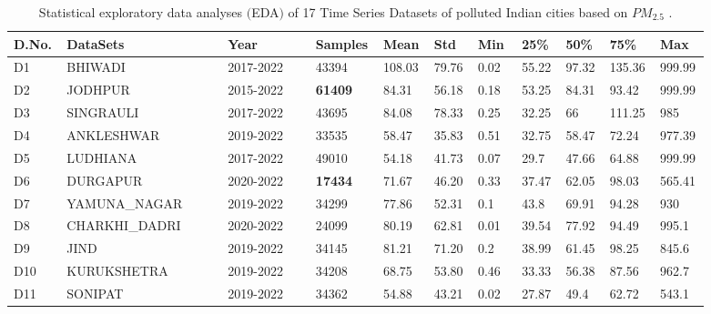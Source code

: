 \begin{landscape}
    \setlength{\tabcolsep}{3pt}
  
    {\renewcommand{\arraystretch}{1}%
    \begin{longtable}[h!]{ p{0.06\linewidth} p{0.22\linewidth} p{0.12\linewidth} p{0.07\linewidth} p{0.06\linewidth}  p{0.06\linewidth} p{0.06\linewidth} p{0.06\linewidth} p{0.06\linewidth} p{0.06\linewidth} p{0.06\linewidth}}%
    \caption{Statistical exploratory data analyses $($EDA$)$ of 17 Time Series Datasets of polluted Indian cities based on $PM_{2.5}$ \cite{bhawan2020central}.}
    \label{Eda1}\\
    \hline D.No. & DataSets & Year  & Samples &Mean &Std & Min &25\% &50\% &75\% & Max\\ \hline
    \endhead
    \hline
    \endfoot
    \endlastfoot
    D1 &  BHIWADI          & 2017-2022  & 43394   & 108.03 & 79.76  & 0.02 & 55.22   & 97.32       & 135.36 & 999.99 \\ 
    D2 &  JODHPUR     & 2015-2022 &\textbf{61409} & 84.31 & 56.18 & 0.18 & 53.25   & 84.31 & 93.42   & 999.99 \\
    D3 &  SINGRAULI    & 2017-2022 & 43695   & 84.08 & 78.33 & 0.25 & 32.25   & 66          & 111.25  & 985    \\
    D4 &  ANKLESHWAR   & 2019-2022  & 33535     & 58.47 & 35.83 & 0.51 & 32.75   & 58.47 & 72.24   & 977.39 \\ 
    D5 &  LUDHIANA        & 2017-2022  & 49010  & 54.18 & 41.73 & 0.07 & 29.7    & 47.66       & 64.88   & 999.99 \\
    D6 &  DURGAPUR       & 2020-2022 & \textbf{17434}   & 71.67 & 46.20 & 0.33 & 37.47 & 62.05      & 98.03 & 565.41 \\ 
    D7 &  YAMUNA\_NAGAR  & 2019-2022 & 34299   & 77.86  & 52.31 & 0.1  & 43.8    & 69.91       & 94.28   & 930    \\
    D8 &  CHARKHI\_DADRI  & 2020-2022  & 24099   & 80.19 & 62.81 & 0.01 & 39.54  & 77.92       & 94.49  & 995.1  \\ 
    D9 &  JIND             & 2019-2022 & 34145 & 81.21 & 71.20 & 0.2  & 38.99   & 61.45       & 98.25   & 845.6  \\ 
    D10 &  KURUKSHETRA    & 2019-2022  & 34208 & 68.75& 53.80 & 0.46 & 33.33   & 56.38       & 87.56   & 962.7  \\ 
    D11 &  SONIPAT        & 2019-2022  & 34362  & 54.88 & 43.21  & 0.02 & 27.87   & 49.4        & 62.72   & 543.1  \\ 

\end{longtable}}
\end{landscape}
